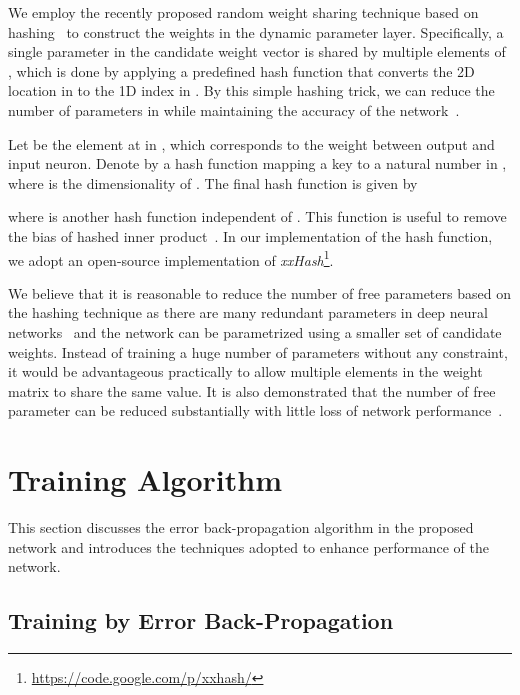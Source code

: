 \documentclass[10pt,twocolumn,letterpaper]{article}
\begin{document}
We employ the recently proposed random weight sharing technique based on hashing~\cite{Hashing} to construct the weights in the dynamic parameter layer. 
Specifically, a single parameter in the candidate weight vector  is shared by multiple elements of , which is done by applying a predefined hash function that converts the 2D location in  to the 1D index in .
By this simple hashing trick, we can reduce the number of parameters in  while maintaining the accuracy of the network~\cite{Hashing}.




Let  be the element at  in , which corresponds to the weight between  output and  input neuron. 
Denote by  a hash function mapping a key  to a natural number in , where  is the dimensionality of .
The final hash function is given by

where  is another hash function independent of .
This function is useful to remove the bias of hashed inner product~\cite{Hashing}.
In our implementation of the hash function, we adopt an open-source implementation of {\it{xxHash}}\footnote{\url{https://code.google.com/p/xxhash/}}.




We believe that it is reasonable to reduce the number of free parameters based on the hashing technique as there are many redundant parameters in deep neural networks~\cite{denil2013predicting} and the network can be parametrized using a smaller set of candidate weights.
Instead of training a huge number of parameters without any constraint, it would be advantageous practically to allow multiple elements in the weight matrix to share the same value.
It is also demonstrated that the number of free parameter can be reduced substantially with little loss of network performance~\cite{Hashing}. 





\section{Training Algorithm}
\label{sec:training}

This section discusses the error back-propagation algorithm in the proposed network and introduces the techniques adopted to enhance performance of the network.


\subsection{Training by Error Back-Propagation}
\end{document}
